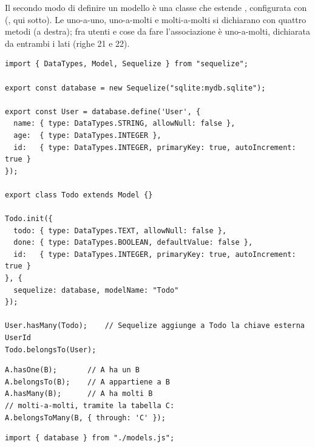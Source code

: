 Il secondo modo di definire un modello è una classe che estende ,
configurata con  (, qui sotto). Le 
uno-a-uno, uno-a-molti e molti-a-molti si dichiarano con quattro metodi (a
destra); fra utenti e cose da fare l'associazione è uno-a-molti, dichiarata da
entrambi i lati (righe 21 e 22).

\begin{affianco}[0.6][t]
\codicepiccolo
\begin{lstlisting}[style=js, name=models.js]
import { DataTypes, Model, Sequelize } from "sequelize";

export const database = new Sequelize("sqlite:mydb.sqlite");

export const User = database.define('User', {
  name: { type: DataTypes.STRING, allowNull: false },
  age:  { type: DataTypes.INTEGER },
  id:   { type: DataTypes.INTEGER, primaryKey: true, autoIncrement: true }
});

export class Todo extends Model {}

Todo.init({
  todo: { type: DataTypes.TEXT, allowNull: false },
  done: { type: DataTypes.BOOLEAN, defaultValue: false },
  id:   { type: DataTypes.INTEGER, primaryKey: true, autoIncrement: true }
}, {
  sequelize: database, modelName: "Todo"
});

User.hasMany(Todo);    // Sequelize aggiunge a Todo la chiave esterna UserId
Todo.belongsTo(User);
\end{lstlisting}
\risultato
\codicepiccolo
\begin{lstlisting}[style=js]
A.hasOne(B);       // A ha un B
A.belongsTo(B);    // A appartiene a B
A.hasMany(B);      // A ha molti B
// molti-a-molti, tramite la tabella C:
A.belongsToMany(B, { through: 'C' });
\end{lstlisting}
\begin{immagine}
\end{immagine}
\begin{lstlisting}[style=js, name=sync.js]
import { database } from "./models.js";


\end{lstlisting}
\end{affianco}
